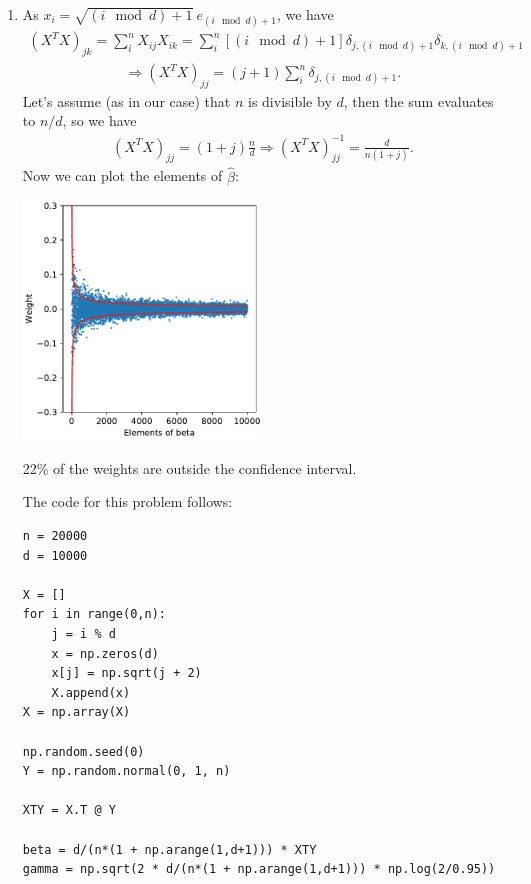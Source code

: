 \documentclass{article}
\begin{document}
\begin{enumerate}
        \item As $x_i = \sqrt{(i \!\!\mod d) + 1} ~ e_{(i \!\!\mod d) + 1}$, we have
        \begin{align*}
                (X^T X)_{jk} 
                = \sum_i^{n} X_{ij} X_{ik} 
                = \sum_i^{n} [(i \!\!\!\!\mod d) + 1] \delta_{j,(i \!\!\!\!\mod d) + 1} \delta_{k,(i \!\!\!\!\mod d) + 1}
        \end{align*}
        \vspace{-5mm}
        \begin{align*}
                \Longrightarrow (X^T X)_{jj} 
                = (j + 1) \sum_i^{n} \delta_{j,(i \!\!\!\!\mod d) + 1}.
        \end{align*}
        Let's assume (as in our case) that $n$ is divisible by $d$, then the sum evaluates to $n/d$, so we have 
        \begin{align*}
                (X^T X)_{jj} = (1 + j) \frac{n}{d} \Longrightarrow (X^T X)_{jj}^{-1} = \frac{d}{n (1+j)}.
        \end{align*}
        Now we can plot the elements of $\hat{\beta}$:
        \begin{center}
                \includegraphics[width=0.5\textwidth]{code/B5d.pdf}
        \end{center}
        22\% of the weights are outside the confidence interval.

        The code for this problem follows:
        \begin{verbatim}
n = 20000
d = 10000

X = []
for i in range(0,n):
    j = i % d
    x = np.zeros(d)
    x[j] = np.sqrt(j + 2)
    X.append(x)
X = np.array(X)

np.random.seed(0)
Y = np.random.normal(0, 1, n)

XTY = X.T @ Y

beta = d/(n*(1 + np.arange(1,d+1))) * XTY
gamma = np.sqrt(2 * d/(n*(1 + np.arange(1,d+1))) * np.log(2/0.95))


\end{verbatim}
\end{enumerate}
\end{document}
